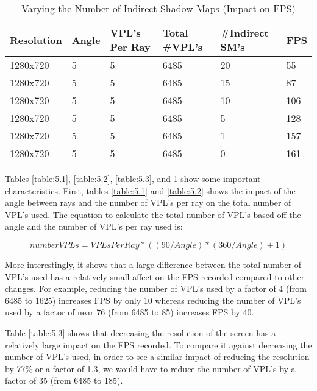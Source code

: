 \begin{table}[h!]
	\caption{Varying the Number of Indirect Shadow Maps (Impact on FPS)}
	\begin{center}
	    \begin{tabular}{ | l | l | l | l | l | l |}
	    \hline
	    Resolution & Angle & VPL's Per Ray & Total \#VPL's & \#Indirect SM's & FPS\\ \hline
	    1280x720 & 5 & 5 & 6485 & 20 & 55\\ \hline
	    1280x720 & 5 & 5 & 6485 & 15 & 87\\ \hline
	    1280x720 & 5 & 5 & 6485 & 10 & 106\\ \hline
	    1280x720 & 5 & 5 & 6485 & 5 & 128\\ \hline
	    1280x720 & 5 & 5 & 6485 & 1 & 157\\ \hline
	    1280x720 & 5 & 5 & 6485 & 0 & 161\\ \hline
	    \end{tabular}
	\end{center}
	\label{table:5.4}
\end{table}

Tables \ref{table:5.1}, \ref{table:5.2}, \ref{table:5.3}, and \ref{table:5.4} show some important characteristics.  First, tables \ref{table:5.1} and \ref{table:5.2} shows the impact of the angle between rays and the number of VPL's per ray on the total number of VPL's used.  The equation to calculate the total number of VPL's based off the angle and the number of VPL's per ray used is:

\begin{equation}
numberVPLs = VPLsPerRay*((90/Angle)*(360/Angle)+1)
\label{eqn:calcVPLtotal}
\end{equation}

More interestingly, it shows that a large difference between the total number of VPL's used has a relatively small affect on the FPS recorded compared to other changes.  For example, reducing the number of VPL's used by a factor of 4 (from 6485 to 1625) increases FPS by only 10 whereas reducing the number of VPL's used by a factor of near 76 (from 6485 to 85) increases FPS by 40.

Table \ref{table:5.3} shows that decreasing the resolution of the screen has a relatively large impact on the FPS recorded.  To compare it against decreasing the number of VPL's used, in order to see a similar impact of reducing the resolution by 77\% or a factor of 1.3, we would have to reduce the number of VPL's by a factor of 35 (from 6485 to 185).

